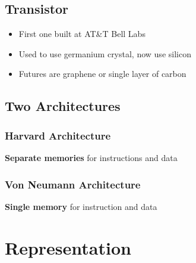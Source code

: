 \documentclass[11pt]{article}
\begin{document}
\subsection{Transistor}
\label{sec:org28effe0}

\begin{itemize}
\item First one built at AT\&T Bell Labs
\item Used to use germanium crystal, now use silicon
\item Futures are graphene or single layer of carbon
\end{itemize}

\subsection{Two Architectures}
\label{sec:orga9b056f}

\subsubsection{Harvard Architecture}
\label{sec:org2cdaae8}

\textbf{\textbf{Separate memories}} for instructions and data

\subsubsection{Von Neumann Architecture}
\label{sec:org9faa97b}

\textbf{\textbf{Single memory}} for instruction and data

\section{Representation}
\label{sec:org84fe7a7}
\end{document}

